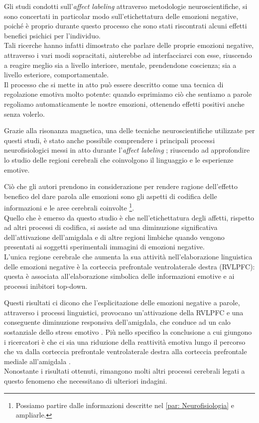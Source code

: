 Gli studi condotti sull'\textit{affect labeling} attraverso metodologie neuroscientifiche, si sono concertati in particolar modo sull'etichettatura delle emozioni negative, poiché è proprio durante questo processo che sono stati riscontrati alcuni effetti benefici psichici per l'individuo.\\
Tali ricerche hanno infatti dimostrato che parlare delle proprie emozioni negative, attraverso i vari modi sopracitati, aiuterebbe ad interfacciarci con esse, riuscendo a reagire meglio sia a livello interiore, mentale, prendendone coscienza; sia a livello esteriore, comportamentale.\\
Il processo che si mette in atto può essere descritto come una tecnica di regolazione emotiva molto potente: quando esprimiamo ciò che sentiamo a parole regoliamo automaticamente le nostre emozioni, ottenendo effetti positivi anche senza volerlo.

Grazie alla risonanza magnetica, una delle tecniche neuroscientifiche utilizzate per questi studi, è stato anche possibile comprendere i principali processi neurofisiologici messi in atto durante l'\textit{affect labeling} \parencite{fmri_affect_labeling}; riuscendo ad approfondire lo studio delle regioni cerebrali che coinvolgono il linguaggio e le esperienze emotive. 

Ciò che gli autori prendono in considerazione per rendere ragione dell’effetto benefico del dare parola alle emozioni sono gli aspetti di codifica delle informazioni e le aree cerebrali coinvolte \footnote{Possiamo partire dalle informazioni descritte nel \autoref{par: Neurofisiologia} e ampliarle.}.\\
Quello che è emerso da questo studio è che nell’etichettatura degli affetti, rispetto ad altri processi di codifica, si assiste ad una diminuzione significativa dell’attivazione dell’amigdala e di altre regioni limbiche quando vengono presentati ai soggetti sperimentali immagini di emozioni negative.\\
L'unica regione cerebrale che aumenta la sua attività nell'elaborazione linguistica delle emozioni negative è la corteccia prefrontale ventrolaterale destra (RVLPFC): questa è associata all'elaborazione simbolica delle informazioni emotive e ai processi inibitori top-down.

Questi risultati ci dicono che l'esplicitazione delle emozioni negative a parole, attraverso i processi linguistici, provocano un'attivazione della RVLPFC e una conseguente diminuzione responsiva dell'amigdala, che conduce ad un calo sostanziale dello stress emotivo \parencite{affect_labeling}.
Più nello specifico la conclusione a cui giungono i ricercatori è che ci sia una riduzione della reattività emotiva lungo il percorso che va dalla corteccia prefrontale ventrolaterale destra alla corteccia prefrontale mediale all’amigdala \parencite{affect_labeling}.\\
Nonostante i risultati ottenuti, rimangono molti altri processi cerebrali legati a questo fenomeno che necessitano di ulteriori indagini. 


